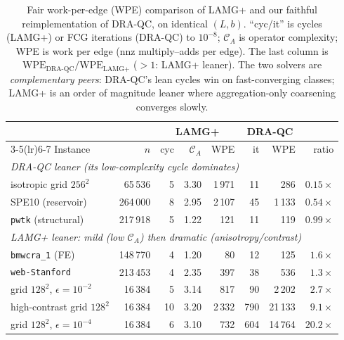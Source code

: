 \begin{table}[t]\centering
\caption{Fair work-per-edge (WPE) comparison of LAMG+ and our faithful reimplementation of
DRA-QC, on identical $(L,b)$. ``cyc/it'' is cycles (LAMG+) or FCG iterations (DRA-QC) to
$10^{-8}$; $\mathcal C_A$ is operator complexity; WPE is work per edge (nnz multiply--adds per
edge). The last column is $\mathrm{WPE}_{\text{DRA-QC}}/\mathrm{WPE}_{\text{LAMG+}}$ ($>1$:
LAMG+ leaner). The two solvers are \emph{complementary peers}: DRA-QC's lean cycles win on
fast-converging classes; LAMG+ is an order of magnitude leaner where aggregation-only
coarsening converges slowly.}\label{tab:draqc}
\begin{tabular}{l r r r r r r r}
\toprule
 & & \multicolumn{3}{c}{LAMG+} & \multicolumn{2}{c}{DRA-QC} & \\
\cmidrule(lr){3-5}\cmidrule(lr){6-7}
Instance & $n$ & cyc & $\mathcal C_A$ & WPE & it & WPE & ratio\\
\midrule
\multicolumn{8}{l}{\emph{DRA-QC leaner (its low-complexity cycle dominates)}}\\
isotropic grid $256^2$       & 65\,536  & 5  & 3.30 & 1\,971 & 11 &   286 & $0.15\times$\\
SPE10 (reservoir)            & 264\,000 & 8  & 2.95 & 2\,107 & 45 & 1\,133 & $0.54\times$\\
\texttt{pwtk} (structural)   & 217\,918 & 5  & 1.22 &    121 & 11 &   119 & $0.99\times$\\
\midrule
\multicolumn{8}{l}{\emph{LAMG+ leaner: mild (low $\mathcal C_A$) then dramatic (anisotropy/contrast)}}\\
\texttt{bmwcra\_1} (FE)      & 148\,770 & 4  & 1.20 &     80 & 12 &   125 & $1.6\times$\\
\texttt{web-Stanford}        & 213\,453 & 4  & 2.35 &    397 & 38 &   536 & $1.3\times$\\
grid $128^2$, $\epsilon{=}10^{-2}$ & 16\,384 & 5 & 3.14 & 817 & 90 & 2\,202 & $2.7\times$\\
high-contrast grid $128^2$   & 16\,384  & 10 & 3.20 & 2\,332 & 790 & 21\,133 & $9.1\times$\\
grid $128^2$, $\epsilon{=}10^{-4}$ & 16\,384 & 6 & 3.10 & 732 & 604 & 14\,764 & $20.2\times$\\
\bottomrule
\end{tabular}
\end{table}

